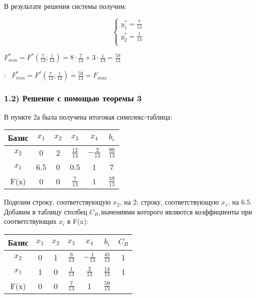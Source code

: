 \begin{flushleft}
В результате решения системы получим:
\end{flushleft}
\begin{equation*}
    \begin{cases}
        y_1^{*} = \frac{7}{13}\\
        y_2^{*} = \frac{1}{13}\\
    \end{cases}
\end{equation*}

\begin{flushleft}
$F_{min}^{*} = F^{*}(\frac{7}{13}; \frac{1}{13}) = 8 \cdot \frac{7}{13} + 3 \cdot \frac{1}{13} = \frac{59}{13}$
\end{flushleft}

{:~} $F_{min}^{*} = F^{*}(\frac{7}{13}; \frac{1}{13}) = \frac{59}{13} = F_{max}$

\subsubsection{1.2) Решение с помощью теоремы 3}

\begin{flushleft}
В пункте 2а была получена итоговая симплекс-таблица:    
\end{flushleft}

\begin{center}
    \begin{tabular}{|c | c c c c c|} 
         \hline
            Базис & $x_1$ & $x_2$ & $x_3$ & $x_4$ & $b_i$\\
         \hline
            $x_2$ & 0 & 2 & $\frac{12}{13}$ & $-\frac{2}{13}$ & $\frac{90}{13}$\\
         \hline
            $x_1$ & 6.5 & 0 & 0.5 & 1 & 7\\
         \hline
            F(x) & 0 & 0 & $\frac{7}{13}$ & 1 & $\frac{59}{13}$\\
         \hline
    \end{tabular}
\end{center}

\begin{flushleft}
Поделим строку, соответствующую $x_2$, на 2; строку, соответствующую $x_1$, на 6.5. Добавим в таблицу столбец $C_{B}$,значениями которого являются коэффициенты при соответствующих $x_i$ в F(x):
\end{flushleft}

\begin{center}
    \begin{tabular}{|c | c c c c c c|} 
         \hline
            Базис & $x_1$ & $x_2$ & $x_3$ & $x_4$ & $b_i$ & $C_{B}$\\
         \hline
            $x_2$ & 0 & 1 & $\frac{6}{13}$ & $-\frac{1}{13}$ & $\frac{45}{13}$ & 1\\
         \hline
            $x_1$ & 1 & 0 & $\frac{1}{13}$ & $\frac{2}{13}$ & $\frac{14}{13}$ & 1\\
         \hline
            F(x) & 0 & 0 & $\frac{7}{13}$ & 1 & $\frac{59}{13}$ &\\
         \hline
    \end{tabular}
\end{center}

